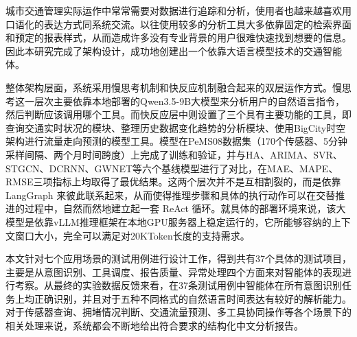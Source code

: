 
\begin{cabstract}

城市交通管理实际运作中常常需要对数据进行追踪和分析，使用者也越来越喜欢用口语化的表达方式同系统交流。以往使用较多的分析工具大多依靠固定的检索界面和预定的报表样式，从而造成许多没有专业背景的用户很难快速找到想要的信息。因此本研究完成了架构设计，成功地创建出一个依靠大语言模型技术的交通智能体。

整体架构层面，系统采用慢思考机制和快反应机制融合起来的双层运作方式。慢思考这一层次主要依靠本地部署的Qwen3.5-9B大模型来分析用户的自然语言指令，然后判断应该调用哪个工具。而快反应层中则设置了三个具有主要功能的工具，即查询交通实时状况的模块、整理历史数据变化趋势的分析模块、使用BigCity时空架构进行流量走向预测的模型工具。模型在PeMS08数据集（170个传感器、5分钟采样间隔、两个月时间跨度）上完成了训练和验证，并与HA、ARIMA、SVR、STGCN、DCRNN、GWNET等六个基线模型进行了对比，在MAE、MAPE、RMSE三项指标上均取得了最优结果。这两个层次并不是互相割裂的，而是依靠 LangGraph 来彼此联系起来，从而使得推理步骤和具体的执行动作可以在交替推进的过程中，自然而然地建立起一套 ReAct 循环。就具体的部署环境来说，该大模型是依靠vLLM推理框架在本地GPU服务器上稳定运行的，它所能够容纳的上下文窗口大小，完全可以满足对20KToken长度的支持需求。

本文针对七个应用场景的测试用例进行设计工作，得到共有37个具体的测试项目，主要是从意图识别、工具调度、报告质量、异常处理四个方面来对智能体的表现进行考察。从最终的实验数据反馈来看，在37条测试用例中智能体在所有意图识别任务上均正确识别，并且对于五种不同格式的自然语言时间表达有较好的解析能力。对于传感器查询、拥堵情况判断、交通流量预测、多工具协同操作等各个场景下的相关处理来说，系统都会不断地给出符合要求的结构化中文分析报告。

\end{cabstract}

